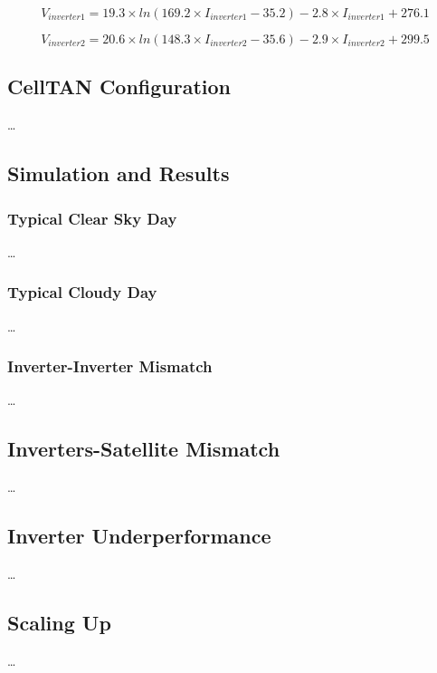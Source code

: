 $$
    V_{inverter1} = 19.3 \times ln(169.2 \times I_{inverter1} - 35.2) - 2.8 \times I_{inverter1} + 276.1
$$

$$
    V_{inverter2} = 20.6 \times ln(148.3 \times I_{inverter2} - 35.6) - 2.9 \times I_{inverter2} + 299.5 
$$

\subsection{CellTAN Configuration}


\dots

\subsection{Simulation and Results} \label{subsec:results}

\subsubsection{Typical Clear Sky Day}

\dots

\subsubsection{Typical Cloudy Day}

\dots

\subsubsection{Inverter-Inverter Mismatch}

\dots

\subsection{Inverters-Satellite Mismatch}

\dots

\subsection{Inverter Underperformance}

\dots

\subsection{Scaling Up}

\dots


